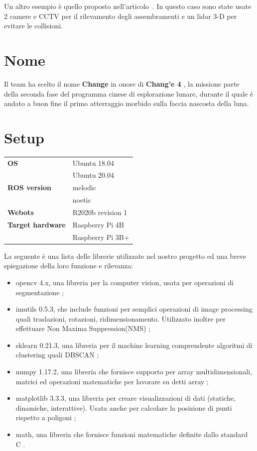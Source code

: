 \documentclass[a4paper]{article}
\begin{document}
	Un altro esempio è quello proposto nell'articolo~\cite{fan2020autonomous}.
	In questo caso sono state usate 2 camere e CCTV per il rilevamento degli
	assembramenti e un lidar 3-D per evitare le collisioni.
	
	\section{Nome}\label{sec:Nome}
	Il team ha scelto il nome \textbf{Change} in onore di \textbf{Chang'e 4}
	\cite{change4}, la missione parte della seconda fase del programma cinese
	di esplorazione lunare, durante il quale è andato a buon fine il primo
	atterraggio morbido sulla faccia nascosta della luna. 
	
	\section{Setup}\label{sec:Setup}
	\begin{table}[H]
		\centering
		\begin{tabular}{l l}
			\hline
			{\bf OS} & Ubuntu 18.04 \\
					 & Ubuntu 20.04 \\ \hline
			{\bf ROS version} & melodic \\
							  & noetic \\ \hline
			\textbf{Webots} & R2020b revision 1\\ \hline
			{\bf Target hardware} & Raspberry Pi 4B \\
								  & Raspberry Pi 3B+ \\ \hline
		\end{tabular}
	\end{table}
	

	La seguente è una lista delle librerie utilizzate nel nostro progetto ed una breve spiegazione della loro funzione e rilevanza:

	\begin{itemize}
		\item opencv 4.x, una libreria per la computer vision, usata per
			operazioni di segmentazione \cite{opencv};
		\item imutils 0.5.3, che include funzioni per semplici operazioni di image
			processing quali traslazioni, rotazioni, ridimensionamento.
			Utilizzato inoltre per effettuare Non Maxima Suppression(NMS)
			\cite{imutils};
		\item sklearn 0.21.3, una libreria per il machine learning comprendente
			algoritmi di clustering quali DBSCAN \cite{scikit};
		\item numpy 1.17.2, una libreria che fornisce supporto per array
			multidimensionali, matrici ed operazioni matematiche per lavorare
			su detti array \cite{numpy};
		\item matplotlib 3.3.3, una libreria per creare visualizzazioni di dati
			(statiche, dinamiche, interattive). Usata anche per calcolare la
			posizione di punti rispetto a poligoni \cite{matplotlib}; 
		\item math, una libreria che fornisce funzioni matematiche definite dallo
			standard C \cite{math}.
	\end{itemize}
\end{document}
